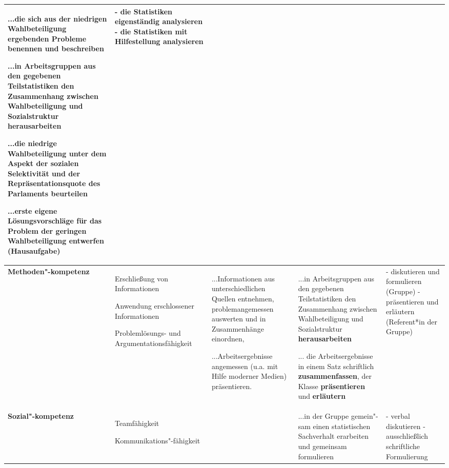 \begin{singlespacing}
\begin{longtable}{p{1.5cm}|p{2cm}|p{4cm}|p{4cm}|p{3cm}}
...die sich aus der niedrigen Wahlbeteiligung ergebenden Probleme \textbf{benennen} und \textbf{beschreiben}

...in Arbeitsgruppen aus den gegebenen Teilstatistiken den Zusammenhang zwischen Wahlbeteiligung und Sozialstruktur \textbf{herausarbeiten}

...die niedrige Wahlbeteiligung unter dem Aspekt der sozialen Selektivität und der Repräsentationsquote des Parlaments \textbf{beurteilen}

...erste eigene Lösungsvorschläge für das Problem der geringen Wahlbeteiligung \textbf{entwerfen} (Hausaufgabe)
&
- die Statistiken eigenständig analysieren \newline
- die Statistiken mit Hilfestellung analysieren \newline


\\
\hline
\textbf{Methoden"-kompetenz} &

Erschließung von Informationen

Anwendung erschlossener Informationen

Problemlösungs- und
Argumentationsfähigkeit

&

...Informationen aus unterschiedlichen Quellen entnehmen, problemangemessen auswerten und in Zusammenhänge einordnen,

...Arbeitsergebnisse angemessen (u.a. mit Hilfe
moderner Medien) präsentieren.


&

...in Arbeitsgruppen aus den gegebenen Teilstatistiken den Zusammenhang zwischen Wahlbeteiligung und Sozialstruktur \textbf{herausarbeiten}

... die Arbeitsergebnisse in einem Satz schriftlich \textbf{zusammenfassen}, der Klasse \textbf{präsentieren} und \textbf{erläutern}

& %
- diskutieren und formulieren (Gruppe) \newline
- präsentieren und erläutern (Referent*in der Gruppe)

\\
\hline
\textbf{Sozial"-kompetenz} &
Teamfähigkeit

Kommunikations"-fähigkeit

& %

&
...in der Gruppe gemein"-sam einen statistischen Sachverhalt erarbeiten und gemeinsam formulieren

& %
- verbal diskutieren \newline
- ausschließlich schriftliche Formulierung


\end{longtable}
\end{singlespacing}
